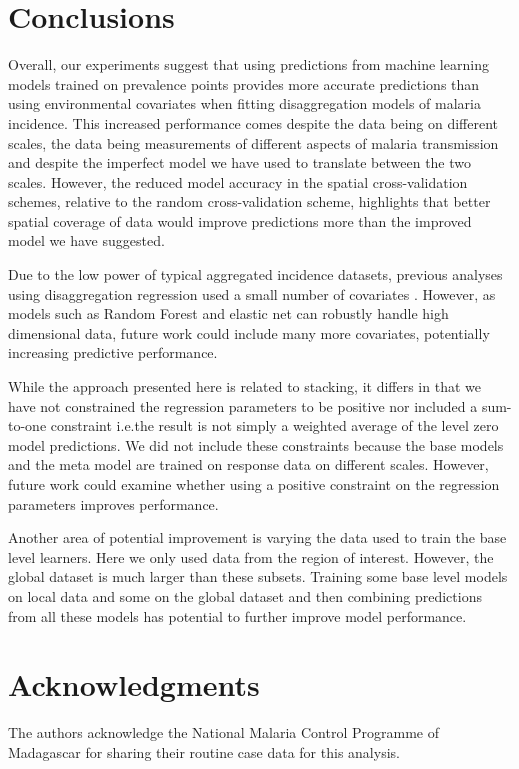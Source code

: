 \documentclass[11pt]{article}
\begin{document}
\section{Conclusions}

Overall, our experiments suggest that using predictions from machine learning models trained on prevalence points provides more accurate predictions than using environmental covariates when fitting disaggregation models of malaria incidence.
This increased performance comes despite the data being on different scales, the data being measurements of different aspects of malaria transmission and despite the imperfect model we have used to translate between the two scales.
However, the reduced model accuracy in the spatial cross-validation schemes, relative to the random cross-validation scheme, highlights that better spatial coverage of data would improve predictions more than the improved model we have suggested.

Due to the low power of typical aggregated incidence datasets, previous analyses using disaggregation regression used a small number of covariates \citep{sturrock2014fine}.
However, as models such as Random Forest and elastic net can robustly handle high dimensional data, future work could include many more covariates, potentially increasing predictive performance.




While the approach presented here is related to stacking, it differs in that we have not constrained the regression parameters to be positive nor included a sum-to-one constraint i.e.\thinspace the result is not simply a weighted average of the level zero model predictions.
We did not include these constraints because the base models and the meta model are trained on response data on different scales.
However, future work could examine whether using a positive constraint on the regression parameters improves performance.

Another area of potential improvement is varying the data used to train the base level learners.
Here we only used data from the region of interest.
However, the global dataset is much larger than these subsets.
Training some base level models on local data and some on the global dataset and then combining predictions from all these models has potential to further improve model performance.

\section*{Acknowledgments}
The authors acknowledge the National Malaria Control Programme of Madagascar for sharing their routine case data for this analysis.

 

\end{document}
